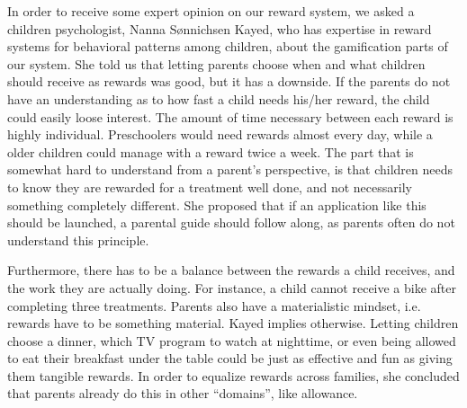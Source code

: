 In order to receive some expert opinion on our reward system, we asked a children psychologist, Nanna S\o nnichsen Kayed, who has expertise in reward systems for behavioral patterns among children, about the gamification parts of our system. 
She told us that letting parents choose when and what children should receive as rewards was good, but it has a downside. If the parents do not have an understanding as to how fast a child needs his/her reward, the child could easily loose interest. The amount of time necessary between each reward is highly individual. Preschoolers would need rewards almost every day, while a older children could manage with a reward twice a week. The part that is somewhat hard to understand from a parent's perspective, is that children needs to know they are rewarded for a treatment well done, and not necessarily something completely different. She proposed that if an application like this should be launched, a parental guide should follow along, as parents often do not understand this principle.

Furthermore, there has to be a balance between the rewards a child receives, and the work they are actually doing. For instance, a child cannot receive a bike after completing three treatments. Parents also have a materialistic mindset, i.e. rewards have to be something material. Kayed implies otherwise. Letting children choose a dinner, which TV program to watch at nighttime, or even being allowed to eat their breakfast under the table could be just as effective and fun as giving them tangible rewards. In order to equalize rewards across families, she concluded that parents already do this in other ``domains'', like allowance.   